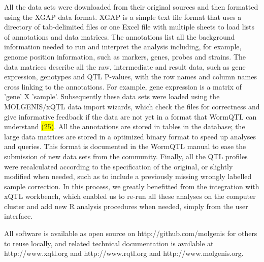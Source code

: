 All the data sets were downloaded from their original sources and then formatted using the 
XGAP data format. XGAP is a simple text file format that uses a directory of tab-delimited 
files or one Excel file with multiple sheets to load lists of annotations and data matrices. 
The annotations list all the background information needed to run and interpret the analysis 
including, for example, genome position information, such as markers, genes, probes and 
strains. The data matrices describe all the raw, intermediate and result data, such as gene 
expression, genotypes and QTL P-values, with the row names and column names cross linking to 
the annotations. For example, gene expression is a matrix of 'gene' X 'sample'. Subsequently 
these data sets were loaded using the MOLGENIS/xQTL data import wizards, which check the 
files for correctness and give informative feedback if the data are not yet in a format that 
WormQTL can understand \colorbox{yellow}{(25)}. All the annotations are stored in tables in the database; the 
large data matrices are stored in a optimized binary format to speed up analyses and queries. 
This format is documented in the WormQTL manual to ease the submission of new data sets from 
the community. Finally, all the QTL profiles were recalculated according to the specification 
of the original, or slightly modified when needed, such as to include a previously missing 
wrongly labelled sample correction. In this process, we greatly benefitted from the integration 
with xQTL workbench, which enabled us to re-run all these analyses on the computer cluster 
and add new R analysis procedures when needed, simply from the user interface.

All software is available as open source on http://github.com/molgenis for others to reuse 
locally, and related technical documentation is available at http://www.xqtl.org and 
http://www.rqtl.org and http://www.molgenis.org.

